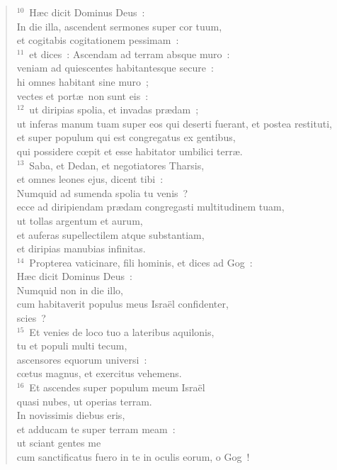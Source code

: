 \begin{verse}${}^{10}$~H\ae c dicit Dominus Deus~:\\ In die illa, ascendent sermones super cor tuum,\\ et cogitabis cogitationem pessimam~:\\
${}^{11}$~et dices~: Ascendam ad terram absque muro~:\\ veniam ad quiescentes habitantesque secure~:\\ hi omnes habitant sine muro~;\\ vectes et port\ae\ non sunt eis~:\\
${}^{12}$~ut diripias spolia, et invadas pr\ae dam~;\\ ut inferas manum tuam super eos qui deserti fuerant, et postea restituti,\\ et super populum qui est congregatus ex gentibus,\\ qui possidere cœpit et esse habitator umbilici terr\ae .\\
${}^{13}$~Saba, et Dedan, et negotiatores Tharsis,\\ et omnes leones ejus, dicent tibi~:\\ Numquid ad sumenda spolia tu venis~?\\ ecce ad diripiendam pr\ae dam congregasti multitudinem tuam,\\ ut tollas argentum et aurum,\\ et auferas supellectilem atque substantiam,\\ et diripias manubias infinitas.\\
${}^{14}$~Propterea vaticinare, fili hominis, et dices ad Gog~:\\ H\ae c dicit Dominus Deus~:\\ Numquid non in die illo,\\ cum habitaverit populus meus Isra\"el confidenter,\\ scies~?\\
${}^{15}$~Et venies de loco tuo a lateribus aquilonis,\\ tu et populi multi tecum,\\ ascensores equorum universi~:\\ cœtus magnus, et exercitus vehemens.\\
${}^{16}$~Et ascendes super populum meum Isra\"el\\ quasi nubes, ut operias terram.\\ In novissimis diebus eris,\\ et adducam te super terram meam~:\\ ut sciant gentes me\\ cum sanctificatus fuero in te in oculis eorum, o Gog~!\end{verse}


